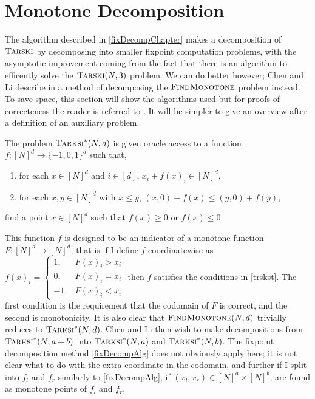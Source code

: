 \section{Monotone Decomposition} \label{monotoneDecompChap}
The algorithm described in \cref{fixDecompChapter} makes a decomposition
of $\textsc{Tarski}$ by decomposing into smaller fixpoint computation problems, with
the asymptotic improvement coming from the fact that there is an algorithm
to efficently solve the $\textsc{Tarski}(N, 3)$ problem. We can do better however;
Chen and Li describe in \citep{chenLi} a method of decomposing the $\textsc{FindMonotone}$
problem instead. To save space, this section will show the algorithms used
but for proofs of correcteness the reader is referred to \citep{chenLi}.
It will be simpler to give an overview after a definition of 
an auxiliary problem.
\newcommand{\trskst}{\textsc{Tarksi}^*}
\begin{definition}[$\trskst$, \citep{chenLi}] \label{trskst}
  The problem $\trskst(N, d)$ is given oracle access to a function $f : [N]^d \to \{-1, 0, 1\}^d$
  such that,
  \begin{enumerate}
    \item for each $x \in [N]^d$ and $i \in [d]$, $x_i + f(x)_i \in [N]^d$,
    \item for each $x, y \in [N]^d$ with $x \leq y$, $(x, 0) + f(x) \leq (y, 0) + f(y)$,
  \end{enumerate}
  find a point $x \in [N]^d$ such that $f(x) \geq 0$ or $f(x) \leq 0$.
\end{definition}
This function $f$ is designed to be an indicator of a monotone function $F : [N]^d \to [N]^d$;
that is if I define $f$ coordinatewise as 
$f(x)_i = \begin{cases} 1, & F(x)_i > x_i \\ 0, & F(x)_i = x_i \\ -1, & F(x)_i < x_i \end{cases}$
then $f$ satisfies the conditions in \cref{trskst}. The first condition is the requirement that
the codomain of $F$ is correct, and the second is monotonicity. It is also clear that $\textsc{FindMonotone}(N, d)$ 
trivially reduces to $\trskst(N, d)$. Chen and Li then wish to make decompositions from
$\trskst(N, a + b)$ into $\trskst(N, a)$ and $\trskst(N, b)$. The fixpoint decomposition
method \cref{fixDecompAlg} does not obviously apply here; it is not clear what to do with the extra
coordinate in the codomain, and further if I split into $f_l$ and $f_r$ similarly to \cref{fixDecompAlg},
if $(x_l, x_r) \in [N]^a \times [N]^b$, are found as monotone points of $f_l$ and $f_r$,
